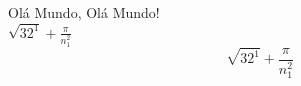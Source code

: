 \documentclass[a4paper,11pt]{book}
\begin{document}
  Ol\'a Mundo, Olá Mundo! \\
  $\sqrt{32^{1}} + \frac{\pi}{n_{1}^{2}}$
  \begin{equation}
    \sqrt{32^{1}} + \frac{\pi}{n_{1}^{2} }
  \end{equation}
\end{document}
